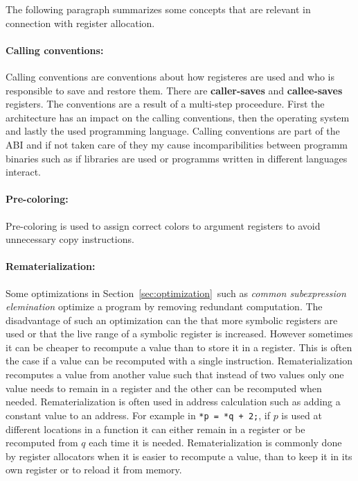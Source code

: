\documentclass[a4paper,10pt]{article}
\begin{document}
The following paragraph summarizes some concepts that are relevant in connection with register allocation.

\paragraph{Calling conventions:} Calling conventions are conventions about how registeres are used and who is responsible to save and
restore them. There are \textbf{caller-saves} and \textbf{callee-saves} registers. The conventions are a result of a multi-step
proceedure. First the architecture has an impact on the calling conventions, then the operating system and lastly the used programming
language. Calling conventions are part of the ABI and if not taken care of they my cause incomparibilities between programm binaries such
as if libraries are used or programms written in different languages interact.

\paragraph{Pre-coloring:} Pre-coloring is used to assign correct colors to argument registers to avoid unnecessary copy instructions.

\paragraph{Rematerialization:} Some optimizations in Section\, \ref{sec:optimization}\, such as \textit{common subexpression
elemination} optimize a program by removing redundant computation. The disadvantage of such an optimization can the that more symbolic
registers are used or that the live range of a symbolic register is increased. However sometimes it can be cheaper to recompute a value
than to store it in a register. This is often the case if a value can be recomputed with a single instruction. Rematerialization
recomputes a value from another value such that instead of two values only one value needs to remain in a register and the other can be
recomputed when needed. Rematerialization is often used in address calculation such as adding a constant value to an address. For example
in \lstinline|*p = *q + 2;|, if $p$ is used at different locations in a function it can either remain in a register or be recomputed
from $q$ each time it is needed. Rematerialization is commonly done by register allocators when it is easier to recompute a value, than
to keep it in its own register or to reload it from memory.
\end{document}
